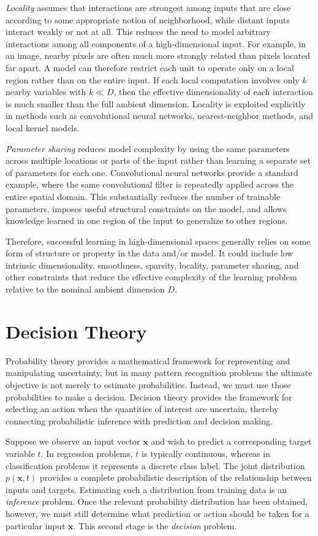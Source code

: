 \documentclass[10pt,twocolumn]{memoir}
\begin{document}
\textit{Locality} assumes that interactions are strongest among inputs that are close according to some appropriate notion of neighborhood, while distant inputs interact weakly or not at all. This reduces the need to model arbitrary interactions among all components of a high-dimensional input. For example, in an image, nearby pixels are often much more strongly related than pixels located far apart. A model can therefore restrict each unit to operate only on a local region rather than on the entire input. If each local computation involves only $k$ nearby variables with $k\ll D$, then the effective dimensionality of each interaction is much smaller than the full ambient dimension. Locality is exploited explicitly in methods such as convolutional neural networks, nearest-neighbor methods, and local kernel models.

\textit{Parameter sharing} reduces model complexity by using the same parameters across multiple locations or parts of the input rather than learning a separate set of parameters for each one. Convolutional neural networks provide a standard example, where the same convolutional filter is repeatedly applied across the entire spatial domain. This substantially reduces the number of trainable parameters, imposes useful structural constraints on the model, and allows knowledge learned in one region of the input to generalize to other regions.

Therefore, successful learning in high-dimensional spaces generally relies on some form of structure or property in the data and/or model. It could include low intrinsic dimensionality, smoothness, sparsity, locality, parameter sharing, and other constraints that reduce the effective complexity of the learning problem relative to the nominal ambient dimension $D$.

\section{Decision Theory}

Probability theory provides a mathematical framework for representing and manipulating uncertainty, but in many pattern recognition problems the ultimate objective is not merely to estimate probabilities. Instead, we must use those probabilities to make a decision. Decision theory provides the framework for selecting an action when the quantities of interest are uncertain, thereby connecting probabilistic inference with prediction and decision making.

Suppose we observe an input vector $\mathbf{x}$ and wish to predict a corresponding target variable $t$. In regression problems, $t$ is typically continuous, whereas in classification problems it represents a discrete class label. The joint distribution $p(\mathbf{x},t)$ provides a complete probabilistic description of the relationship between inputs and targets. Estimating such a distribution from training data is an \textit{inference} problem. Once the relevant probability distribution has been obtained, however, we must still determine what prediction or action should be taken for a particular input $\mathbf{x}$. This second stage is the \textit{decision} problem.
\end{document}
